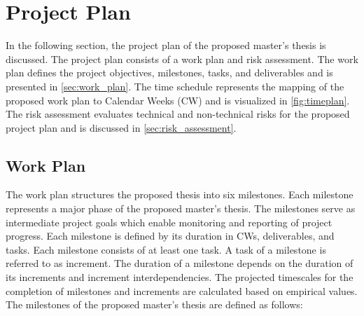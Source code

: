 \chapter{Project Plan}
\label{ch:project_plan}
In the following section, the project plan of the proposed master's thesis is discussed.
The project plan consists of a work plan and risk assessment.
The work plan defines the project objectives, milestones, tasks, and deliverables and is presented in \autoref{sec:work_plan}.
The time schedule represents the mapping of the proposed work plan to Calendar Weeks (CW) and is visualized in \autoref{fig:timeplan}.
The risk assessment evaluates technical and non-technical risks for the proposed project plan and is discussed in \autoref{sec:risk_assessment}.

\section{Work Plan}
\label{sec:work_plan}
The work plan structures the proposed thesis into six milestones.
Each milestone represents a major phase of the proposed master's thesis.
The milestones serve as intermediate project goals which enable monitoring and reporting of project progress.
Each milestone is defined by its duration in CWs, deliverables, and tasks.
Each milestone consists of at least one task.
A task of a milestone is referred to as increment.
The duration of a milestone depends on the duration of its increments and increment interdependencies.
The projected timescales for the completion of milestones and increments are calculated based on empirical values.
The milestones of the proposed master's thesis are defined as follows:
